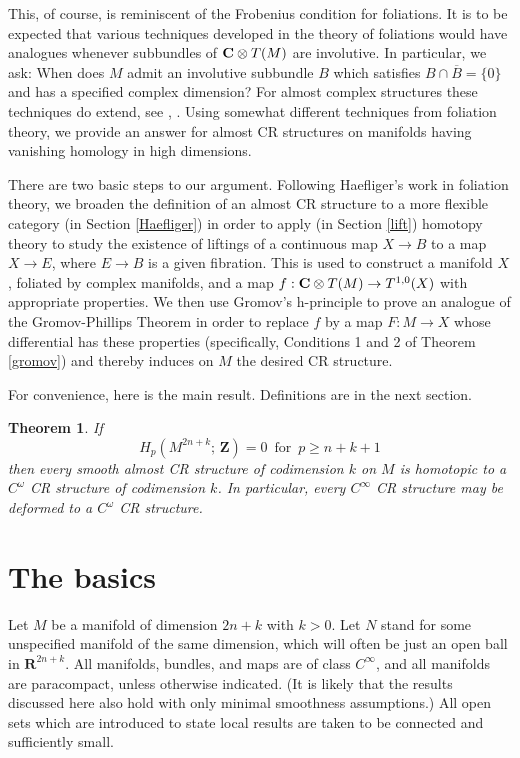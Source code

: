 \documentclass{amsart}
\newtheorem{theorem}{Theorem}[section]
\begin{document}
This, of course, is reminiscent of the Frobenius condition for
foliations.  It is to be expected that various techniques developed in
the theory of foliations would have analogues whenever subbundles of
${{\bf{C}}\otimes T(M)}$ are involutive.
In particular, we ask: When does $M$ admit an involutive subbundle $B$ which satisfies 
$B \cap \overline B = \{0\}$ and has a specified complex dimension?
For almost complex structures these techniques do extend, see \cite{Ad}, \cite{Land}.  Using somewhat different
techniques from
foliation theory, we provide an answer for almost CR structures on manifolds having vanishing homology in high dimensions.  

There are two basic steps to our argument.  Following Haefliger's work in foliation theory, we broaden the definition of an almost CR structure 
to a more flexible category (in Section \ref{Haefliger}) in order to apply (in Section \ref{lift}) homotopy theory to study the existence  of liftings of a continuous map $X \to B$ to a map $X \to E$, where $E \to B$ is a given fibration.
This is used to construct a manifold $X$, foliated by
complex manifolds, and a map $f: {{\bf{C}}\otimes T(M)} \to {T^{1,0}} (X)$ with
appropriate properties.  We then use Gromov's h-principle to prove an
analogue of the Gromov-Phillips Theorem in order to replace $f$ by a map
$F: M \to X$ whose differential has these properties (specifically,
Conditions 1 and 2 of Theorem \ref{gromov}) and thereby induces on $M$
the desired CR structure.

For convenience, here is the main result. Definitions are in the
next section. 

\begin{theorem} \label{mainresult}
If
\[
H_{p}(M^{2n+k};\, \mathbf Z)=0 \,\text{ for }\, p\geq n+k+1
\]
then every smooth   almost CR structure of codimension $k$ on $M$ is
homotopic to a $C^\omega$ CR structure of codimension $k$.  
In particular, every $C^\infty$ CR structure may be deformed to a
$C^\omega$ CR structure.
\end{theorem}

\section{The basics}
Let $M$ be a manifold of dimension $2n+k$ with $k>0$.  Let $N$
stand for some unspecified manifold of the same dimension, which will
often be just an open ball in ${\mathbf{R}} ^{2n+k}$.  All manifolds, bundles,
and maps are of class $C^\infty$, and all manifolds are paracompact, unless otherwise
indicated. 
(It is likely that the results discussed here also hold
with only minimal smoothness assumptions.)  
All open sets which are
introduced to state local results are taken to be connected and
sufficiently small.
\end{document}
